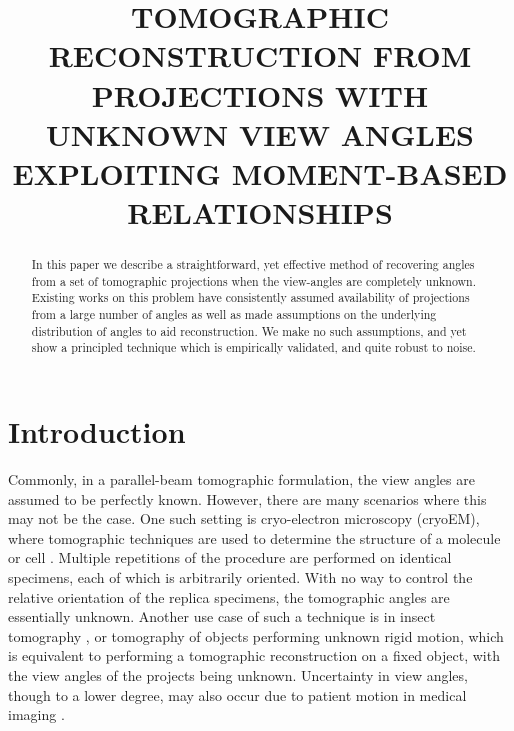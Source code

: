 \documentclass{article}
\title{TOMOGRAPHIC RECONSTRUCTION FROM PROJECTIONS WITH UNKNOWN VIEW ANGLES EXPLOITING MOMENT-BASED RELATIONSHIPS}
\begin{document}
%
\maketitle
%
\begin{abstract}
In this paper we describe a straightforward, yet effective method of recovering angles from a set of tomographic projections when the view-angles are completely unknown. Existing works on this problem have consistently assumed availability of projections from a large number of angles as well as made assumptions on the underlying distribution of angles to aid reconstruction. We make no such assumptions, and yet show a principled technique which is empirically validated, and quite robust to noise. 	
\end{abstract}
%
%
\section{Introduction}
\label{sec:intro}
Commonly, in a parallel-beam tomographic formulation, the view angles are assumed to be perfectly known. However, there are many scenarios where this may not be the case. One such setting is cryo-electron microscopy (cryoEM), where tomographic techniques are used to determine the structure of a molecule or cell \cite{Frank1996}. Multiple repetitions of the procedure are performed on identical specimens, each of which is arbitrarily oriented. With no way to control the relative orientation of the replica specimens, the tomographic angles are essentially unknown. Another use case of such a technique is in insect tomography \cite{Walker2014}, or tomography of objects performing unknown rigid motion, which is equivalent to performing a tomographic reconstruction on a fixed object, with the view angles of the projects being unknown. Uncertainty in view angles, though to a lower degree, may also occur due to patient motion in medical imaging \cite{Wood1995}. 
\end{document}
